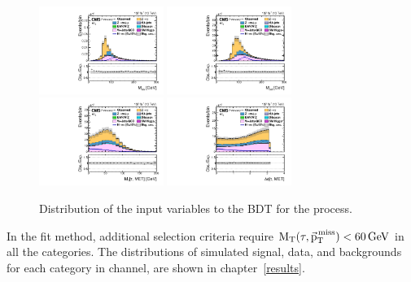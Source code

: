 \begin{figure}[htbp!]
  \includegraphics[width=0.36\textwidth]{plots/chapter6/etau/e_t_Mass.pdf}
  \includegraphics[width=0.36\textwidth]{plots/chapter6/etau/e_t_CollinearMass.pdf}\\
  \includegraphics[width=0.36\textwidth]{plots/chapter6/etau/MTTauMET.pdf}
  \includegraphics[width=0.36\textwidth]{plots/chapter6/etau/dPhiTauMET.pdf}\\
  \caption{Distribution of the input variables to the BDT for the \ehad process.}
  \label{fig:input_et}
\end{figure}

In the \mcol fit method, additional selection criteria require $\text{M}_\mathrm{T}(\tau,{\vec{\text{p}}}_{\mathrm{T}}^{\kern1pt\text{miss}}) < 60 \,\text{Ge\hspace{-.08em}V}$ in all the categories. The \mcol distributions of simulated signal, data, and backgrounds for each category in \ehad channel, are shown in chapter~\ref{results}.

